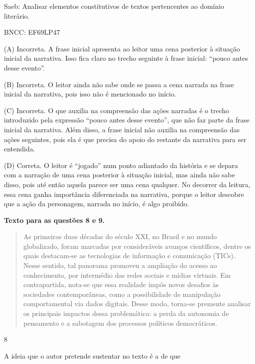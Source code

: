 Saeb: Analisar elementos constitutivos de textos pertencentes ao domínio
literário.

BNCC: EF69LP47

(A) Incorreta. A frase inicial apresenta ao leitor uma cena posterior à
situação inicial da narrativa. Isso fica claro no trecho seguinte à
frase inicial: ``pouco antes desse evento''.

(B) Incorreta. O leitor ainda não sabe onde se passa a cena narrada na
frase inicial da narrativa, pois isso não é mencionado no início.

(C) Incorreta. O que auxilia na compreensão das ações narradas é o
trecho introduzido pela expressão ``pouco antes desse evento'', que não
faz parte da frase inicial da narrativa. Além disso, a frase inicial não
auxilia na compreensão das ações seguintes, pois ela é que precisa do
apoio do restante da narrativa para ser entendida.

(D) Correta. O leitor é ``jogado'' num ponto adiantado da história e se
depara com a narração de uma cena posterior à situação inicial, mas
ainda não sabe disso, pois até então aquela parece ser uma cena
qualquer. No decorrer da leitura, essa cena ganha importância
diferenciada na narrativa, porque o leitor descobre que a ação da
personagem, narrada no início, é algo proibido.

\textbf{Texto para as questões 8 e 9.}

\begin{quote}
As primeiras duas décadas do século XXI, no Brasil e no mundo
globalizado, foram marcadas por consideráveis avanços científicos,
dentre os quais destacam-se as tecnologias de informação e comunicação
(TICs). Nesse sentido, tal panorama promoveu a ampliação do acesso ao
conhecimento, por intermédio das redes sociais e mídias virtuais. Em
contrapartida, nota-se que essa realidade impôs novos desafios às
sociedades contemporâneas, como a possibilidade de manipulação
comportamental via dados digitais. Desse modo, torna-se premente
analisar os principais impactos dessa problemática: a perda da autonomia
de pensamento e a sabotagem dos processos políticos democráticos.
\end{quote}


\num{8}

A ideia que o autor pretende sustentar no texto é a de que

